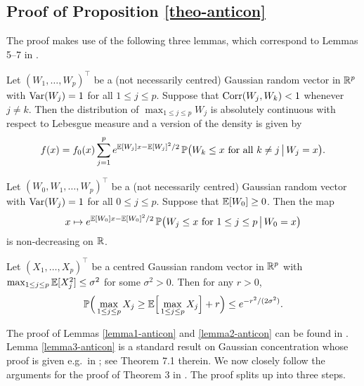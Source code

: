 \documentclass[a4paper,12pt]{article}
\begin{document}
\subsection*{Proof of Proposition \ref{theo-anticon}}

 
The proof makes use of the following three lemmas, which correspond to Lemmas 5--7 in \cite{Chernozhukov2015}. 
\begin{lemma}\label{lemma1-anticon}
Let $(W_1,\ldots,W_p)^\top$ be a (not necessarily centred) Gaussian random vector in $\mathbb{R}^p$ with $\textnormal{Var}(W_j) = 1$ for all $1 \le j \le p$. Suppose that $\textnormal{Corr}(W_j,W_k) < 1$ whenever $j \ne k$. Then the distribution of $\max_{1 \le j \le p} W_j$ is absolutely continuous with respect to Lebesgue measure and a version of the density is given by 
\[ f(x) = f_0(x) \sum\limits_{j=1}^p e^{\mathbb{E}[W_j]x - \mathbb{E}[W_j]^2/2} \, \mathbb{P} \big(W_k \le x \text{ for all } k \ne j \, \big| \, W_j = x \big). \]
\end{lemma}
\begin{lemma}\label{lemma2-anticon}
Let $(W_0,W_1,\ldots,W_p)^\top$ be a (not necessarily centred) Gaussian random vector with $\textnormal{Var}(W_j) = 1$ for all $0 \le j \le p$. Suppose that $\mathbb{E}[W_0] \ge 0$. Then the map 
\[ x \mapsto  e^{\mathbb{E}[W_0]x - \mathbb{E}[W_0]^2/2} \, \mathbb{P} \big(W_j \le x \text{ for } 1 \le j \le p \, \big| \, W_0 = x \big) \]
is non-decreasing on $\mathbb{R}$. 
\end{lemma}
\begin{lemma}\label{lemma3-anticon}
Let $(X_1,\ldots,X_p)^\top$ be a centred Gaussian random vector in $\mathbb{R}^p$ with $\max_{1 \le j \le p} \mathbb{E}[X_j^2] \le \sigma^2$ for some $\sigma^2 > 0$. Then for any $r > 0$, 
\[ \mathbb{P} \Big( \max_{1 \le j \le p} X_j \ge \mathbb{E} \Big[ \max_{1 \le j \le p} X_j \Big] + r \Big) \le e^{-r^2/(2\sigma^2)}. \]
\end{lemma} 
The proof of Lemmas \ref{lemma1-anticon} and \ref{lemma2-anticon} can be found in \cite{Chernozhukov2015}. Lemma \ref{lemma3-anticon} is a standard result on Gaussian concentration whose proof is given e.g.\ in \cite{Ledoux2001}; see Theorem 7.1 therein. We now closely follow the arguments for the proof of Theorem 3 in \cite{Chernozhukov2015}. The proof splits up into three steps. 
\vspace{7pt}
\end{document}
